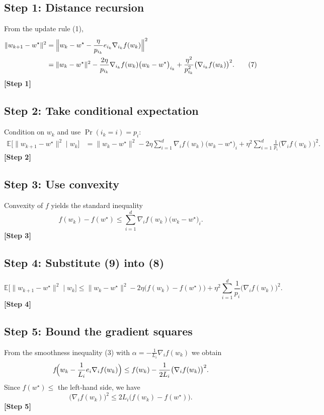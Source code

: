 \documentclass{article}
\newcommand{\E}{\mathbb{E}}
\begin{document}
\subsection*{Step 1: Distance recursion}
From the update rule (1),
\[
\begin{aligned}
\|w_{k+1}-w^{\star}\|^{2}
&=\Bigl\|w_{k}-w^{\star}
      -\frac{\eta}{p_{i_k}}e_{i_k}\nabla_{i_k}f(w_k)\Bigr\|^{2}\\
&=\|w_{k}-w^{\star}\|^{2}
   -\frac{2\eta}{p_{i_k}}\nabla_{i_k}f(w_k)\bigl(w_{k}-w^{\star}\bigr)_{i_k}
   +\frac{\eta^{2}}{p_{i_k}^{2}}\bigl(\nabla_{i_k}f(w_k)\bigr)^{2}.
\tag{7}
\end{aligned}
\]
\textbf{[Step 1]}

\subsection*{Step 2: Take conditional expectation}
Condition on $w_k$ and use $\Pr(i_k=i)=p_i$:
\[
\begin{aligned}
\E\!\bigl[\|w_{k+1}-w^{\star}\|^{2}\mid w_k\bigr]
&=\|w_{k}-w^{\star}\|^{2}
   -2\eta\sum_{i=1}^{d}\nabla_i f(w_k)\bigl(w_{k}-w^{\star}\bigr)_i
   +\eta^{2}\sum_{i=1}^{d}\frac{1}{p_i}\bigl(\nabla_i f(w_k)\bigr)^{2}.
\tag{8}
\end{aligned}
\]
\textbf{[Step 2]}

\subsection*{Step 3: Use convexity}
Convexity of $f$ yields the standard inequality
\[
f(w_k)-f(w^{\star})\le
\sum_{i=1}^{d}\nabla_i f(w_k)\bigl(w_{k}-w^{\star}\bigr)_i .
\tag{9}
\]
\textbf{[Step 3]}

\subsection*{Step 4: Substitute (9) into (8)}
\[
\E\!\bigl[\|w_{k+1}-w^{\star}\|^{2}\mid w_k\bigr]
\le\|w_{k}-w^{\star}\|^{2}
   -2\eta\bigl(f(w_k)-f(w^{\star})\bigr)
   +\eta^{2}\sum_{i=1}^{d}\frac{1}{p_i}\bigl(\nabla_i f(w_k)\bigr)^{2}.
\tag{10}
\]
\textbf{[Step 4]}

\subsection*{Step 5: Bound the gradient squares}
From the smoothness inequality (3) with $\alpha=-\frac{1}{L_i}\nabla_i f(w_k)$ we obtain
\[
f\!\Bigl(w_k-\frac{1}{L_i}e_i\nabla_i f(w_k)\Bigr)
\le f(w_k)-\frac{1}{2L_i}\bigl(\nabla_i f(w_k)\bigr)^{2}.
\]
Since $f(w^{\star})\le$ the left‑hand side, we have
\[
\bigl(\nabla_i f(w_k)\bigr)^{2}\le 2L_i\bigl(f(w_k)-f(w^{\star})\bigr).
\tag{11}
\]
\textbf{[Step 5]}
\end{document}
